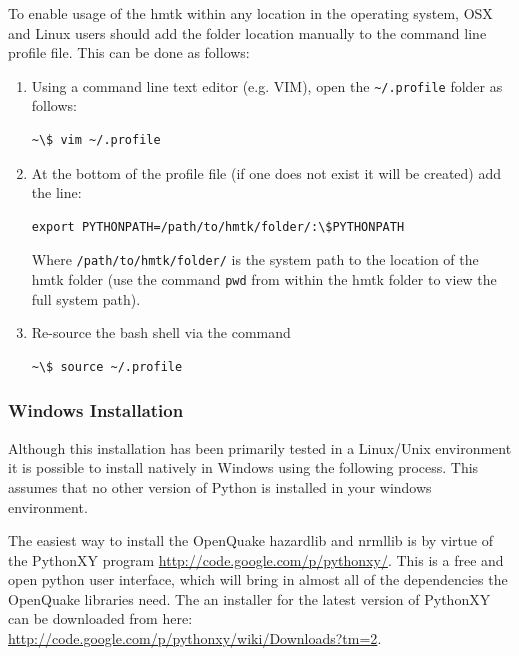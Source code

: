To enable usage of the hmtk within any location in the operating system, OSX and Linux users should add the folder location manually to the command line profile file. This can be done as follows:

\begin{enumerate}
\item Using a command line text editor (e.g. VIM), open the \verb=~/.profile= folder as follows:

\begin{Verbatim}[frame=single, commandchars=\\\{\}, fontsize=\scriptsize]
~\$ vim ~/.profile
\end{Verbatim}

\item At the bottom of the profile file (if one does not exist it will be created) add the line:

\begin{Verbatim}[frame=single, commandchars=\\\{\}, fontsize=\scriptsize]
export PYTHONPATH=/path/to/hmtk/folder/:\$PYTHONPATH
\end{Verbatim}

Where \verb=/path/to/hmtk/folder/= is the system path to the location of the hmtk folder (use the command \verb=pwd= from within the hmtk folder to view the full system path).

\item Re-source the bash shell via the command

\begin{Verbatim}[frame=single, commandchars=\\\{\}, fontsize=\scriptsize]
~\$ source ~/.profile
\end{Verbatim}
 
\end{enumerate}

\subsubsection{Windows Installation}

Although this installation has been primarily tested in a Linux/Unix environment it is possible to install natively in Windows using the following process. This assumes that no other version of Python is installed in your windows environment.

The easiest way to install the OpenQuake hazardlib and nrmllib is by virtue of the PythonXY program \href{http://code.google.com/p/pythonxy/}{http://code.google.com/p/pythonxy/}. This is a free and open python user interface, which will bring in almost all of the dependencies the OpenQuake libraries need. The an installer for the latest version of PythonXY can be downloaded from here: \href{http://code.google.com/p/pythonxy/wiki/Downloads?tm=2}{http://code.google.com/p/pythonxy/wiki/Downloads?tm=2}.

